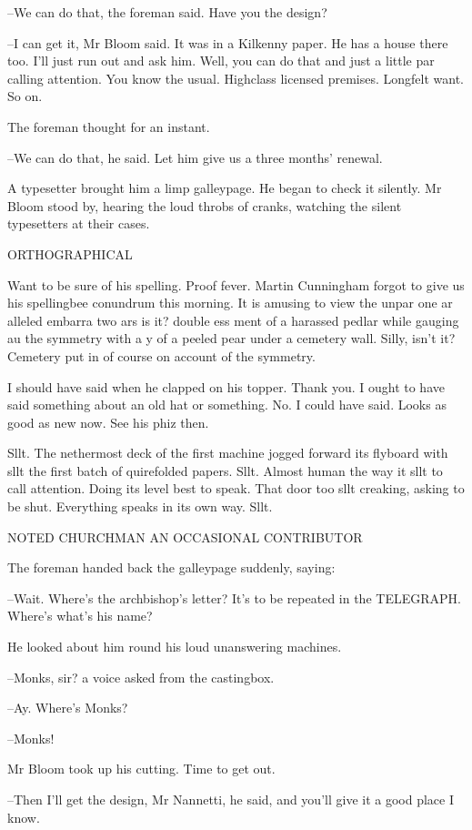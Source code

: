 --We can do that, the foreman said. Have you the design?

--I can get it, Mr Bloom said. It was in a Kilkenny paper. He has a house
there too. I'll just run out and ask him. Well, you can do that and just a
little par calling attention. You know the usual. Highclass licensed
premises. Longfelt want. So on.

The foreman thought for an instant.

--We can do that, he said. Let him give us a three months' renewal.

A typesetter brought him a limp galleypage. He began to check it
silently. Mr Bloom stood by, hearing the loud throbs of cranks, watching
the silent typesetters at their cases.


    ORTHOGRAPHICAL


Want to be sure of his spelling. Proof fever. Martin Cunningham
forgot to give us his spellingbee conundrum this morning. It is amusing to
view the unpar one ar alleled embarra two ars is it? double ess ment of a
harassed pedlar while gauging au the symmetry with a y of a peeled pear
under a cemetery wall. Silly, isn't it? Cemetery put in of course on
account of the symmetry.

I should have said when he clapped on his topper. Thank you. I ought
to have said something about an old hat or something. No. I could have
said. Looks as good as new now. See his phiz then.

Sllt. The nethermost deck of the first machine jogged forward its
flyboard with sllt the first batch of quirefolded papers. Sllt. Almost
human the way it sllt to call attention. Doing its level best to speak.
That door too sllt creaking, asking to be shut. Everything speaks in its
own way. Sllt.


    NOTED CHURCHMAN AN OCCASIONAL CONTRIBUTOR


The foreman handed back the galleypage suddenly, saying:

--Wait. Where's the archbishop's letter? It's to be repeated in the
TELEGRAPH. Where's what's his name?

He looked about him round his loud unanswering machines.

--Monks, sir? a voice asked from the castingbox.

--Ay. Where's Monks?

--Monks!

Mr Bloom took up his cutting. Time to get out.

--Then I'll get the design, Mr Nannetti, he said, and you'll give it a
good place I know.

